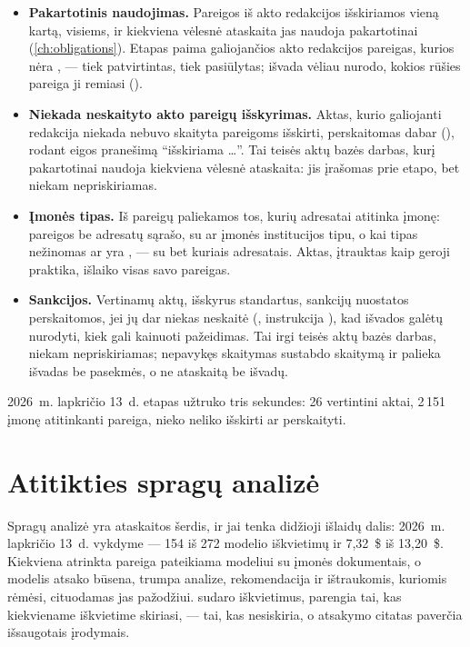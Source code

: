 \begin{itemize}
  \item \textbf{Pakartotinis naudojimas.} Pareigos iš akto redakcijos išskiriamos vieną kartą,
    visiems, ir kiekviena vėlesnė ataskaita jas naudoja pakartotinai (\cref{ch:obligations}).
    Etapas paima galiojančios akto redakcijos pareigas, kurios nėra , --- tiek
    patvirtintas, tiek pasiūlytas; išvada vėliau nurodo, kokios rūšies pareiga ji remiasi
    ().
  \item \textbf{Niekada neskaityto akto pareigų išskyrimas.} Aktas, kurio galiojanti redakcija
    niekada nebuvo skaityta pareigoms išskirti, perskaitomas dabar
    (), rodant eigos pranešimą \enquote{išskiriama \ldots}. Tai teisės
    aktų bazės darbas, kurį pakartotinai naudoja kiekviena vėlesnė ataskaita: jis įrašomas prie
    etapo, bet niekam nepriskiriamas.
  \item \textbf{Įmonės tipas.} Iš pareigų paliekamos tos, kurių adresatai atitinka įmonę: pareigos be
    adresatų sąrašo, su  ar įmonės institucijos tipu, o kai tipas nežinomas
    ar yra , --- su bet kuriais adresatais. Aktas, įtrauktas kaip geroji praktika, išlaiko visas savo
    pareigas.
  \item \textbf{Sankcijos.} Vertinamų aktų, išskyrus standartus, sankcijų nuostatos
    perskaitomos, jei jų dar niekas neskaitė (, instrukcija
    ), kad išvados galėtų nurodyti, kiek gali kainuoti pažeidimas. Tai
    irgi teisės aktų bazės darbas, niekam nepriskiriamas; nepavykęs skaitymas sustabdo skaitymą
    ir palieka išvadas be pasekmės, o ne ataskaitą be išvadų.
\end{itemize}

2026~m. lapkričio 13~d. etapas užtruko tris sekundes: 26 vertintini aktai, 2\,151 įmonę
atitinkanti pareiga, nieko neliko išskirti ar perskaityti.


\section{Atitikties spragų analizė}\label{sec:report:gap}

Spragų analizė yra ataskaitos šerdis, ir jai tenka didžioji išlaidų dalis: 2026~m. lapkričio
13~d. vykdyme --- 154 iš 272 modelio iškvietimų ir 7,32~\$ iš 13,20~\$. Kiekviena atrinkta
pareiga pateikiama modeliui su įmonės dokumentais, o modelis atsako būsena, trumpa analize,
rekomendacija ir ištraukomis, kuriomis rėmėsi, cituodamas jas pažodžiui.
 sudaro iškvietimus,  parengia tai, kas kiekviename
iškvietime skiriasi,  --- tai, kas nesiskiria, o
 atsakymo citatas paverčia išsaugotais įrodymais.

